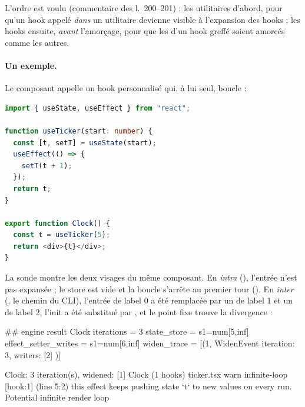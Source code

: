 
L'ordre est voulu (commentaire des l.~200--201) : les utilitaires d'abord,
pour qu'un hook appelé \emph{dans} un utilitaire devienne visible à
l'expansion des hooks ; les hooks ensuite, \emph{avant} l'amorçage, pour que
les  d'un hook greffé soient amorcés comme les autres.

\paragraph{Un exemple.} Le composant  appelle un hook
personnalisé qui, à lui seul, boucle :

\begin{lstlisting}[language=TypeScript,caption={Un hook personnalisé qui boucle (\file{/tmp/ch13/ticker.tsx})},label={lst:point-fixe-composant-ticker}]
import { useState, useEffect } from "react";

function useTicker(start: number) {
  const [t, setT] = useState(start);
  useEffect(() => {
    setT(t + 1);
  });
  return t;
}

export function Clock() {
  const t = useTicker(5);
  return <div>{t}</div>;
}
\end{lstlisting}

La sonde montre les deux visages du même composant. En \emph{intra}
(), l'entrée  n'est
pas expansée ; le store est vide et la boucle s'arrête au premier tour
(). En \emph{inter} (, le chemin
du CLI), l'entrée  de label 0 a été remplacée par un
 de label 1 et un  de label 2, l'init  a
été substitué par , et le point fixe trouve la divergence :

\begin{sortie}
## engine result Clock
  iterations = 3
  state_store = s1=num[5,inf]
  effect_setter_writes = s1=num[6,inf]
  widen_trace = [(1, WidenEvent { iteration: 3, writers: [2] })]
\end{sortie}
\begin{sortie}
  [verbose] Clock: 3 iteration(s), widened: [1]
  Clock  (1 hooks)  ticker.tsx
    warn   infinite-loop  [hook:1]  (line 5:2)  this effect keeps pushing state `t` to new values on every run. Potential infinite render loop
\end{sortie}

